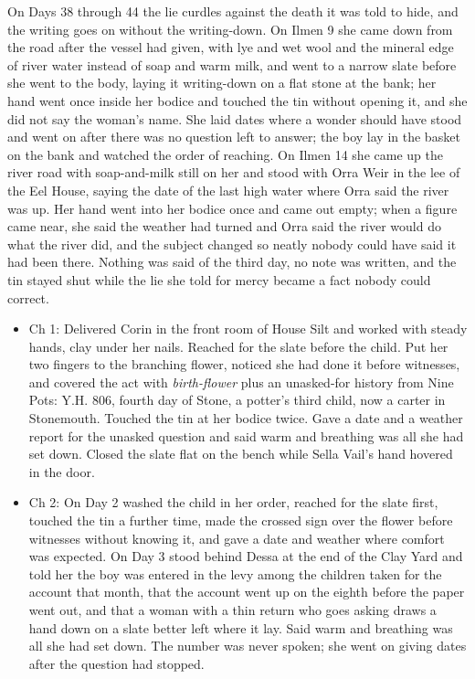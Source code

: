 \documentclass{design/chronicle}
\begin{document}
{On Days 38 through 44 the lie curdles against the death it was told to hide, and the writing goes on without the writing-down. On Ilmen 9 she came down from the road after the vessel had given, with lye and wet wool and the mineral edge of river water instead of soap and warm milk, and went to a narrow slate before she went to the body, laying it writing-down on a flat stone at the bank; her hand went once inside her bodice and touched the tin without opening it, and she did not say the woman’s name. She laid dates where a wonder should have stood and went on after there was no question left to answer; the boy lay in the basket on the bank and watched the order of reaching. On Ilmen 14 she came up the river road with soap-and-milk still on her and stood with Orra Weir in the lee of the Eel House, saying the date of the last high water where Orra said the river was up. Her hand went into her bodice once and came out empty; when a figure came near, she said the weather had turned and Orra said the river would do what the river did, and the subject changed so neatly nobody could have said it had been there. Nothing was said of the third day, no note was written, and the tin stayed shut while the lie she told for mercy became a fact nobody could correct.

\begin{itemize}[leftmargin=1.4em,itemsep=1pt,topsep=3pt,parsep=0pt]

\item Ch 1: Delivered Corin in the front room of House Silt and worked with steady hands, clay under her nails. Reached for the slate before the child. Put her two fingers to the branching flower, noticed she had done it before witnesses, and covered the act with \emph{birth-flower} plus an unasked-for history from Nine Pots: Y.H. 806, fourth day of Stone, a potter’s third child, now a carter in Stonemouth. Touched the tin at her bodice twice. Gave a date and a weather report for the unasked question and said warm and breathing was all she had set down. Closed the slate flat on the bench while Sella Vail’s hand hovered in the door.

\item Ch 2: On Day 2 washed the child in her order, reached for the slate first, touched the tin a further time, made the crossed sign over the flower before witnesses without knowing it, and gave a date and weather where comfort was expected. On Day 3 stood behind Dessa at the end of the Clay Yard and told her the boy was entered in the levy among the children taken for the account that month, that the account went up on the eighth before the paper went out, and that a woman with a thin return who goes asking draws a hand down on a slate better left where it lay. Said warm and breathing was all she had set down. The number was never spoken; she went on giving dates after the question had stopped.


\end{itemize}}
\end{document}

